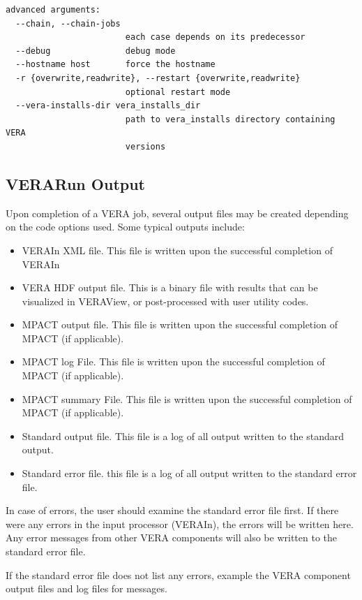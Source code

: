 \begin{Verbatim}[fontsize=\small]
advanced arguments:
  --chain, --chain-jobs
                        each case depends on its predecessor
  --debug               debug mode
  --hostname host       force the hostname
  -r {overwrite,readwrite}, --restart {overwrite,readwrite}
                        optional restart mode
  --vera-installs-dir vera_installs_dir
                        path to vera_installs directory containing VERA
                        versions

\end{Verbatim}

\subsection{VERARun Output}

Upon completion of a VERA job, several output files may be created depending on the code options used.
Some typical outputs include:
\begin{itemize}
\item VERAIn XML file.  This file is written upon the successful completion of VERAIn
\item VERA HDF output file.  This is a binary file with results that can be visualized in VERAView, or post-processed with user utility codes.
\item MPACT output file.  This file is written upon the successful completion of MPACT (if applicable).
\item MPACT log File.  This file is written upon the successful completion of MPACT (if applicable).
\item MPACT summary File.  This file is written upon the successful completion of MPACT (if applicable).
\item Standard output file. This file is a log of all output written to the standard output.
\item Standard error file.  this file is a log of all output written to the standard error file.
\end{itemize}


In case of errors, the user should examine the standard error file first.
If there were any errors in the input processor (VERAIn), the errors will be written here.
Any error messages from other VERA components will also be written to the standard error file.

If the standard error file does not list any errors, example the VERA component output files and log files for messages.












